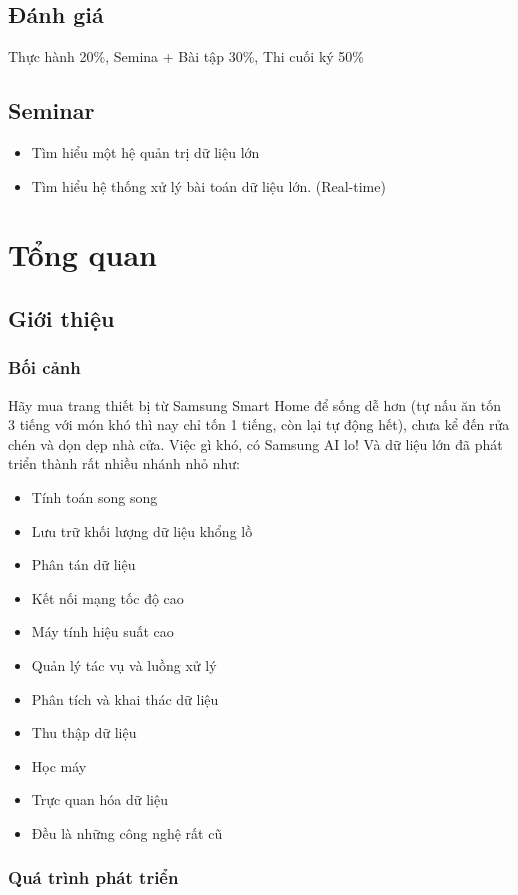 \section{ Đánh giá }
\tab Thực hành 20\%, Semina + Bài tập 30\%, Thi cuối ký 50\% 
\section{ Seminar}
\begin{itemize}
	\item Tìm hiểu một hệ quản trị dữ liệu lớn
	\item Tìm hiểu hệ thống xử lý bài toán dữ liệu lớn. (Real-time)
\end{itemize}
\chapter{ Tổng quan }
\section{ Giới thiệu }
\subsection{ Bối cảnh }
\tab Hãy mua trang thiết bị từ Samsung Smart Home để sống dễ hơn (tự nấu ăn tốn 
3 tiếng với món khó thì nay chỉ tốn 1 tiếng, còn lại tự động hết), chưa kể đến
rửa chén và dọn dẹp nhà cửa. Việc gì khó, có Samsung AI lo! Và dữ liệu lớn
đã phát triển thành rất nhiều nhánh nhỏ như:
\begin{itemize}
	\item Tính toán song song
	\item Lưu trữ khối lượng dữ liệu khổng lồ
	\item Phân tán dữ liệu
	\item Kết nối mạng tốc độ cao
	\item Máy tính hiệu suất cao
	\item Quản lý tác vụ và luồng xử lý
	\item Phân tích và khai thác dữ liệu
	\item Thu thập dữ liệu
	\item Học máy
	\item Trực quan hóa dữ liệu
	\item Đều là những công nghệ rất cũ
\end{itemize}
 
\subsection{ Quá trình phát triển }
